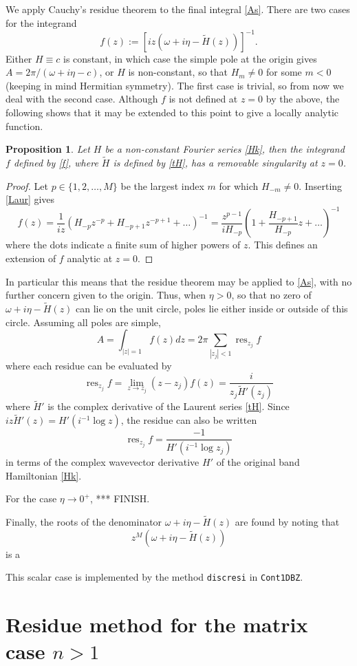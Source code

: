 \documentclass[11pt]{article}
\newcommand{\be}{\begin{equation}}
\newcommand{\ee}{\end{equation}}
\DeclareMathOperator{\res}{res}
\newtheorem{pro}[thm]{Proposition}
\newcommand{\om}{\omega}
\newcommand{\tH}{\tilde H}
\begin{document}
We apply Cauchy's residue theorem to the final integral \eqref{As}.
There are two cases for
the integrand
\be
f(z) := [iz(\om+ i\eta - \tH(z))]^{-1}.
\label{f}
\ee
Either $H\equiv c$ is constant, in which case the simple pole at the
origin gives
$A = 2\pi / (\om+i\eta-c)$, or $H$ is non-constant, so that
$H_m\neq 0$ for some $m<0$ (keeping in mind Hermitian symmetry).
The first case is trivial, so from now we deal with the second case.
Although $f$ is not defined at $z=0$ by the above, the following shows that
it may be extended to this point to give a locally analytic function.
\begin{pro}
  Let $H$ be a non-constant Fourier series \eqref{Hk}, then
  the integrand $f$ defined by \eqref{f}, where $\tH$ is defined by
  \eqref{tH}, has a removable singularity at $z=0$.
\end{pro}
\begin{proof}
  Let $p \in \{1,2, \dots, M\}$
  be the largest index $m$ for which $H_{-m} \neq 0$.
  Inserting \eqref{Laur} gives
  $$
  f(z) = \frac{1}{iz}\left( H_{-p}z^{-p} + H_{-p+1}z^{-p+1} + \dots \right)^{-1}
  =
  \frac{z^{p-1}}{iH_{-p}}\left( 1 + \frac{H_{-p+1}}{H_{-p}}z + \dots \right)^{-1}
  $$
  where the dots indicate a finite sum of higher powers of $z$.
  This defines an extension of $f$ analytic at $z=0$.
\end{proof}
In particular this means that the residue theorem may be applied to
\eqref{As}, with no further concern given to the origin.
Thus, when $\eta>0$, so that no zero of $\om + i\eta - \tH(z)$ can lie
on the unit circle, poles lie either inside or outside of this circle.
Assuming all poles are simple,
\be
A = \int_{|z|=1} f(z) dz = 2\pi \sum_{|z_j|<1} \res_{z_j} f
\ee
where each residue can be evaluated by
\be
\res_{z_j} f = \lim_{z\to z_j} (z-z_j)f(z) = \frac{i}{z_j \tH'(z_j)}
\label{res}
\ee
where $\tH'$ is the complex derivative of the Laurent series \eqref{tH}.
Since $iz\tH'(z) = H'(i^{-1}\log z)$, the residue can
also be written
\be
\res_{z_j} f  = \frac{-1}{H'(i^{-1}\log z_j)}
\ee
in terms of the complex wavevector derivative $H'$ of the original band
Hamiltonian \eqref{Hk}.

For the case $\eta\to0^+$,
***
FINISH.

Finally, the roots of the denominator $\om + i\eta - \tH(z)$
are found by noting that
$$
z^M(\om + i\eta - \tH(z))
$$
is a 


This scalar case is implemented by the method \texttt{discresi} in
\texttt{Cont1DBZ}.



\section{Residue method for the matrix case $n>1$}








\end{document}
